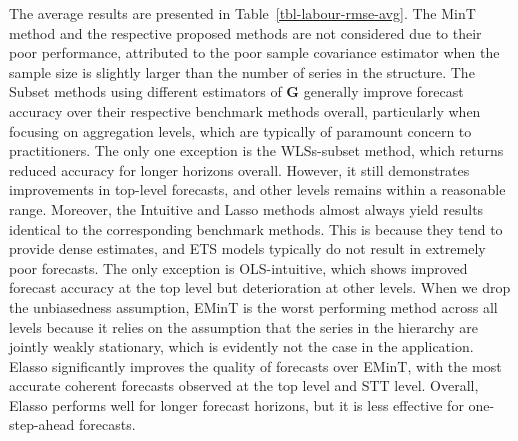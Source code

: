 \documentclass[
  12pt,
  11pt]{article}
\begin{document}
The average results are presented in Table~\ref{tbl-labour-rmse-avg}.
The MinT method and the respective proposed methods are not considered
due to their poor performance, attributed to the poor sample covariance
estimator when the sample size is slightly larger than the number of
series in the structure. The Subset methods using different estimators
of \(\bm{G}\) generally improve forecast accuracy over their respective
benchmark methods overall, particularly when focusing on aggregation
levels, which are typically of paramount concern to practitioners. The
only one exception is the WLSs-subset method, which returns reduced
accuracy for longer horizons overall. However, it still demonstrates
improvements in top-level forecasts, and other levels remains within a
reasonable range. Moreover, the Intuitive and Lasso methods almost
always yield results identical to the corresponding benchmark methods.
This is because they tend to provide dense estimates, and ETS models
typically do not result in extremely poor forecasts. The only exception
is OLS-intuitive, which shows improved forecast accuracy at the top
level but deterioration at other levels. When we drop the unbiasedness
assumption, EMinT is the worst performing method across all levels
because it relies on the assumption that the series in the hierarchy are
jointly weakly stationary, which is evidently not the case in the
application. Elasso significantly improves the quality of forecasts over
EMinT, with the most accurate coherent forecasts observed at the top
level and STT level. Overall, Elasso performs well for longer forecast
horizons, but it is less effective for one-step-ahead forecasts.
\end{document}
